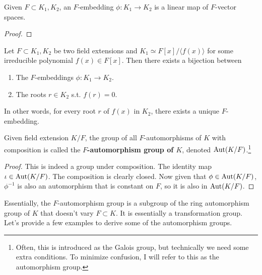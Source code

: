   \begin{lemma}
    Given $F \subset K_1, K_2$, an $F$-embedding $\phi: K_1 \to K_2$ is a linear map of $F$-vector spaces. 
  \end{lemma}
  \begin{proof}
    
  \end{proof}

  \begin{lemma}
    Let $F \subset K_1, K_2$ be two field extensions and $K_1 \simeq F[x] / \langle f(x) \rangle$ for some irreducible polynomial $f(x) \in F[x]$. Then there exists a bijection between 
    \begin{enumerate}
      \item The $F$-embeddings $\phi: K_1 \to K_2$. 
      \item The roots $r \in K_2$ s.t. $f(r) = 0$. 
    \end{enumerate}
    In other words, for every root $r$ of $f(x)$ in $K_2$, there exists a unique $F$-embedding. 
  \end{lemma}

  \begin{definition}
    Given field extension $K/F$, the group of all $F$-automorphisms of $K$ with composition is called the \textbf{$F$-automorphism group of $K$}, denoted $\Aut(K/F)$.\footnote{Often, this is introduced as the Galois group, but technically we need some extra conditions. To minimize confusion, I will refer to this as the automorphism group.}
  \end{definition}
  \begin{proof}
    This is indeed a group under composition. The identity map $\iota \in \Aut(K/F)$. The composition is clearly closed. Now given that $\phi \in \Aut(K/F)$, $\phi^{-1}$ is also an automorphism that is constant on $F$, so it is also in $\Aut(K/F)$. 
  \end{proof} 

  Essentially, the $F$-automorphism group is a subgroup of the ring automorphism group of $K$ that doesn't vary $F \subset K$. It is essentially a transformation group. Let's provide a few examples to derive some of the automorphism groups. 

